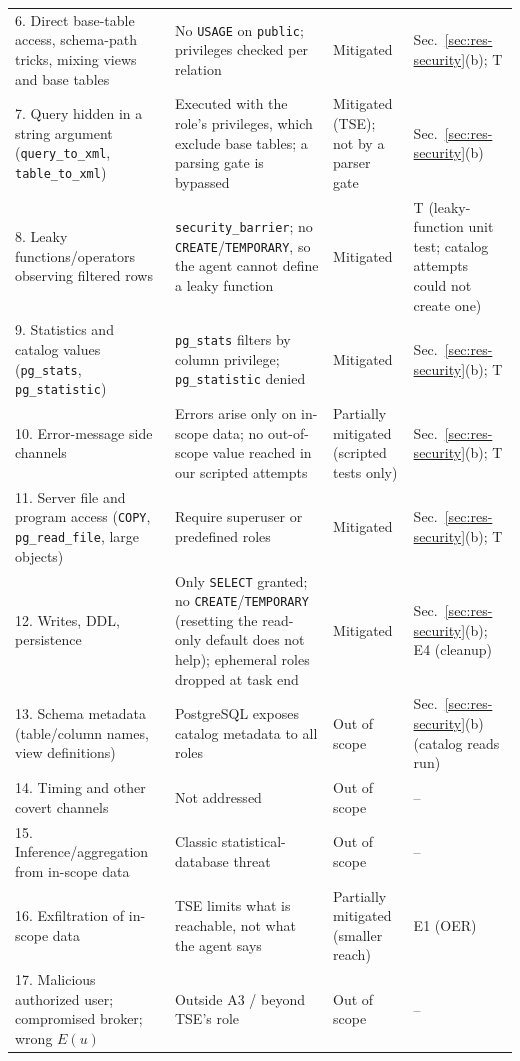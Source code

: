 \begin{table}[t]
\begin{tabular}{p{4.1cm}p{6.6cm}p{2.3cm}p{3.2cm}}
6. Direct base-table access, schema-path tricks, mixing views and base tables & No \texttt{USAGE} on \texttt{public}; privileges checked per relation & Mitigated & Sec.~\ref{sec:res-security}(b); T \\
7. Query hidden in a string argument (\texttt{query\_to\_xml}, \texttt{table\_to\_xml}) & Executed with the role's privileges, which exclude base tables; a parsing gate is bypassed & Mitigated (TSE); not by a parser gate & Sec.~\ref{sec:res-security}(b) \\
8. Leaky functions/operators observing filtered rows & \texttt{security\_barrier}; no \texttt{CREATE}/\texttt{TEMPORARY}, so the agent cannot define a leaky function & Mitigated & T (leaky-function unit test; catalog attempts could not create one) \\
9. Statistics and catalog values (\texttt{pg\_stats}, \texttt{pg\_statistic}) & \texttt{pg\_stats} filters by column privilege; \texttt{pg\_statistic} denied & Mitigated & Sec.~\ref{sec:res-security}(b); T \\
10. Error-message side channels & Errors arise only on in-scope data; no out-of-scope value reached in our scripted attempts & Partially mitigated (scripted tests only) & Sec.~\ref{sec:res-security}(b); T \\
11. Server file and program access (\texttt{COPY}, \texttt{pg\_read\_file}, large objects) & Require superuser or predefined roles & Mitigated & Sec.~\ref{sec:res-security}(b); T \\
12. Writes, DDL, persistence & Only \texttt{SELECT} granted; no \texttt{CREATE}/\texttt{TEMPORARY} (resetting the read-only default does not help); ephemeral roles dropped at task end & Mitigated & Sec.~\ref{sec:res-security}(b); E4 (cleanup) \\
13. Schema metadata (table/column names, view definitions) & PostgreSQL exposes catalog metadata to all roles & Out of scope & Sec.~\ref{sec:res-security}(b) (catalog reads run) \\
14. Timing and other covert channels & Not addressed & Out of scope & -- \\
15. Inference/aggregation from in-scope data & Classic statistical-database threat~\cite{denning1979tracker} & Out of scope & -- \\
16. Exfiltration of in-scope data & TSE limits what is reachable, not what the agent says & Partially mitigated (smaller reach) & E1 (OER) \\
17. Malicious authorized user; compromised broker; wrong $E(u)$ & Outside A3 / beyond TSE's role & Out of scope & -- \\
\hline
\end{tabular}
\end{table}

